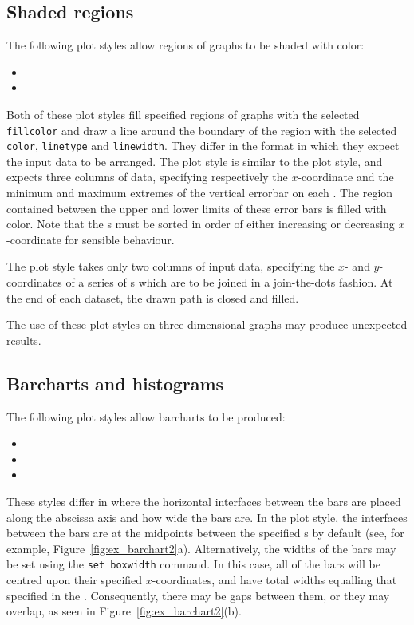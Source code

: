 \subsection{Shaded regions}

The following plot styles allow regions of graphs to be shaded with color:

\begin{itemize}
\item {}
\item {}
\end{itemize}

Both of these plot styles fill specified regions of graphs with the selected
{\tt fillcolor} and draw a line around the boundary of the region with the
selected {\tt color}, {\tt linetype} and {\tt linewidth}. They differ in the
format in which they expect the input data to be arranged. The
 plot style is similar to the  plot
style, and expects three columns of data, specifying respectively the
$x$-coordinate and the minimum and maximum extremes of the vertical errorbar on
each \datapoint.  The region contained between the upper and lower limits of
these error bars is filled with color.  Note that the \datapoint s must be
sorted in order of either increasing or decreasing $x$-coordinate for sensible
behaviour.

The  plot style takes only two columns of input data,
specifying the $x$- and $y$-coordinates of a series of \datapoint s which are
to be joined in a join-the-dots fashion. At the end of each dataset, the drawn
path is closed and filled.

The use of these plot styles on three-dimensional graphs may produce unexpected
results.

\subsection{Barcharts and histograms}
\label{sec:barcharts}

The following plot styles allow barcharts to be produced:
\begin{itemize}
\item {}
\item {}
\item {}
\end{itemize}
These styles differ in where the horizontal interfaces between the
bars are placed along the abscissa axis and how wide the bars are.  In the
 plot style, the interfaces between the bars are at the midpoints
between the specified \datapoint s by default (see, for example,
Figure~\ref{fig:ex_barchart2}a).  Alternatively, the widths of the bars may be
set using the {\tt set boxwidth} command. In this case, all of the bars will be
centred upon their specified $x$-coordinates, and have total widths equalling
that specified in the . Consequently, there may be gaps
between them, or they may overlap, as seen in Figure~\ref{fig:ex_barchart2}(b).

